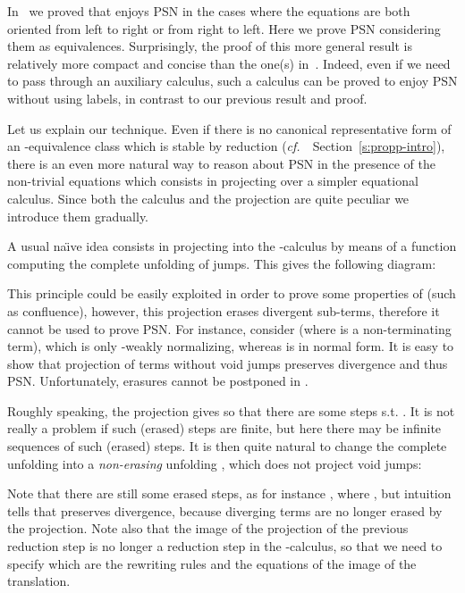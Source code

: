 \documentclass{LMCS}
\newcommand{\cf}{{\it  cf.}~}
\renewcommand{\>}{\rightarrow}
\begin{document}
\noindent In~\cite{AK10} we proved that  enjoys PSN in the cases where
the equations  are both oriented from left to
right or from right to left. Here we prove PSN considering them as
equivalences. Surprisingly, the proof of this more
  general result is relatively more compact
  and concise than the one(s) in~\cite{AK10}. Indeed, even if we need
  to pass through an auxiliary calculus, such a calculus can be proved
  to enjoy PSN without using labels, in contrast to our previous
  result and proof. \medskip



Let us explain our technique. Even if there is no canonical representative form of an
-equivalence class which is stable by reduction
(\cf\ Section~\ref{s:propp-intro}), there is an even more natural way
to reason about PSN in the presence of the non-trivial 
equations
 which consists in projecting
 over a simpler equational calculus. Since both the calculus
and the projection are quite peculiar we introduce them
gradually.\medskip

A usual na\"{\i}ve idea consists in projecting  
into the -calculus by means of a function computing the complete
unfolding of jumps. This gives the following diagram:

This principle could be easily exploited in order to prove some
properties of  (such as confluence), however, this projection
erases divergent sub-terms, therefore it cannot be used to prove
PSN. For instance, consider 
(where  is a non-terminating term), which is only
-weakly normalizing, whereas  is in normal form. It
is easy to show that projection of terms without void jumps preserves
divergence and thus PSN.  Unfortunately, erasures cannot be postponed
in .\medskip

Roughly speaking, the projection gives  so
that there are some steps  s.t. .  It
is not really a problem if such (erased) steps are finite, but here
there may be infinite sequences of such (erased) steps. It is then quite natural to
change the complete unfolding  into a \textit{non-erasing}
unfolding , which does not project void jumps:

 
Note that there are still some erased steps, as for instance
, where , but intuition
tells that  preserves divergence, because diverging terms
  are no longer erased by the projection. Note also that the image of the projection of
the previous reduction step  is no longer a reduction
step in the -calculus, so that we need to specify which are the
rewriting rules and the equations of the image of the
translation.  \medskip
\end{document}
